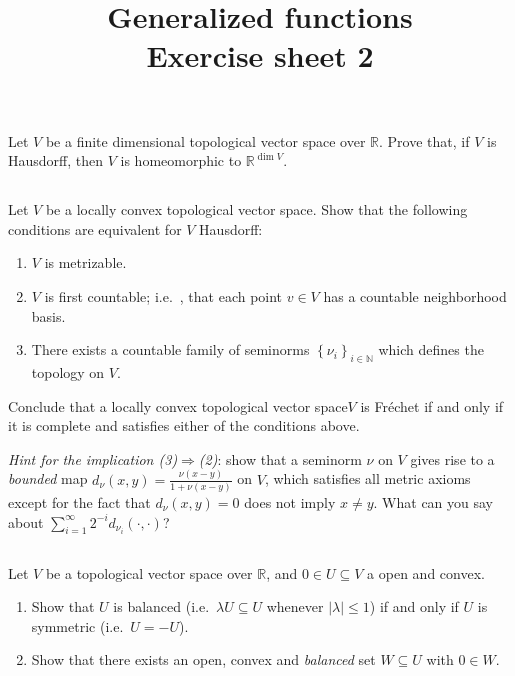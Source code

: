 \documentclass[11pt, reqno,a4paper, twoside]{amsproc}
\title{Generalized functions\\Exercise sheet 2}
\newcommand{\dbN}{\mathbb N}
\newcommand{\dbR}{\mathbb R}
\newcommand{\set}[1]{\left\{{#1}\right\}}
\newcommand{\abs}[1]{\left|#1\right|}
\newcommand{\lctvs}{locally convex topological vector space}
\begin{document}
\maketitle

\subsection{}Let $V$ be a finite dimensional topological vector space over $\dbR$. Prove that, if $V$ is Hausdorff, then $V$ is homeomorphic to $\dbR^{\dim V}$.

\subsection{} Let $V$ be a \lctvs. Show that the following conditions are equivalent for $V$ Hausdorff:
\begin{enumerate}
	\item $V$ is metrizable. 
	\item $V$ is first countable; i.e.\ , that each point $v\in V$ has a countable neighborhood basis.
	\item  There exists a countable family of seminorms $\set{\nu_i}_{i\in\dbN}$ which defines the topology on $V$.
\end{enumerate}
Conclude that a \lctvs $V$ is Fr\'echet if and only if it is complete and satisfies either of the conditions above.

{\it Hint for the implication (3)$\Rightarrow$(2)}: show that a seminorm $\nu$ on $V$ gives rise to a \emph{bounded} map $d_\nu(x,y)=\frac{\nu(x-y)}{1+\nu(x-y)}$ on $V$, which satisfies all metric axioms except for the fact that $d_\nu(x,y)=0$ does not imply $x\ne y$. What can you say about $\sum_{i=1}^\infty 2^{-i}d_{\nu_i}(\cdot,\cdot)$?

\subsection{}
Let $V$ be a topological vector space over $\dbR$, and $0\in U\subseteq V$ a open and convex. 
\begin{enumerate}
	\item Show that $U$ is balanced (i.e.\ $\lambda U\subseteq U$ whenever $\abs{\lambda}\le 1$) if and only if $U$ is symmetric (i.e.\ $U=-U$).
	\item Show that there exists an open, convex and \textit{balanced} set $W\subseteq U$ with $0\in W$. 
\end{enumerate}
\end{document}
